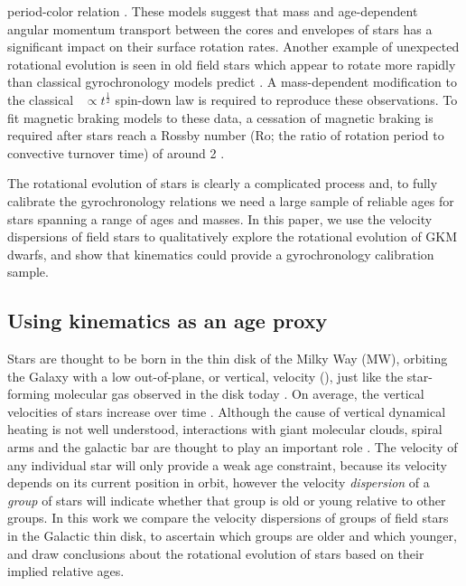 period-color relation \citep{spada2019}.
These models suggest that mass and age-dependent angular momentum transport
between the cores and envelopes of stars has a significant impact on their
surface rotation rates.
Another example of unexpected rotational evolution is seen in old field stars
which appear to rotate more rapidly than classical gyrochronology models
predict \citep{angus2015, vansaders2016, vansaders2018, metcalfe2019}.
A mass-dependent modification to the classical \prot\ $\propto
t^{\frac{1}{2}}$ spin-down law \citep{skumanich1972} is required to reproduce
these observations.
To fit magnetic braking models to these data, a cessation of magnetic braking
is required after stars reach a Rossby number (Ro; the ratio of rotation
period to convective turnover time) of around 2 \citep{vansaders2016,
vansaders2018}.

The rotational evolution of stars is clearly a complicated process and, to
fully calibrate the gyrochronology relations we need a large sample of
reliable ages for stars spanning a range of ages and masses.
In this paper, we use the velocity dispersions of field stars to qualitatively
explore the rotational evolution of GKM dwarfs, and show that kinematics could
provide a gyrochronology calibration sample.

\subsection{Using kinematics as an age proxy}

Stars are thought to be born in the thin disk of the Milky Way (MW), orbiting
the Galaxy with a low out-of-plane, or vertical, velocity (\vz),
just like the star-forming molecular gas observed in the disk today
\citep[\eg][]{stark1989, stark2005, aumer2009, martig2014, aumer2016}.
On average, the vertical velocities of stars increase over time
\citep[\eg][]{nordstrom2004, holmberg2007, holmberg2009, aumer2009,
casagrande2011}.
Although the cause of vertical dynamical heating is not well understood,
interactions with giant molecular clouds, spiral arms and the galactic bar are
thought to play an important role \citep[see][for a review of secular
evolution in the MW]{sellwood2014}.
The velocity of any individual star will only provide a weak age constraint,
because its velocity depends on its current position in orbit, however the
velocity {\it dispersion} of a {\it group} of stars will indicate whether that
group is old or young relative to other groups.
In this work we compare the velocity dispersions of groups of field stars in
the Galactic thin disk, to ascertain which groups are older and which younger,
and draw conclusions about the rotational evolution of stars based on their
implied relative ages.

